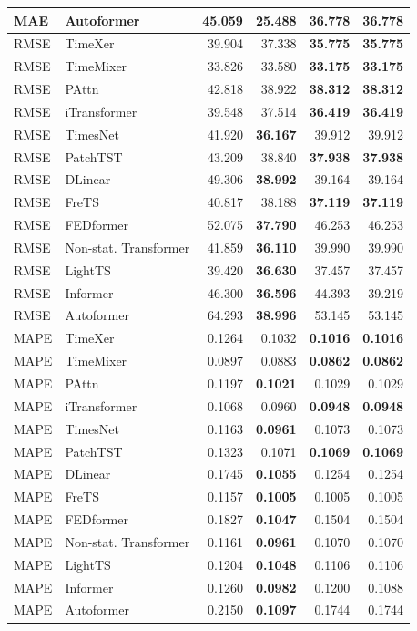 \begin{longtable}{llrrrr}
MAE & Autoformer & 45.059 & \textbf{25.488} & 36.778 & 36.778 \\
\midrule
RMSE & TimeXer & 39.904 & 37.338 & \textbf{35.775} & \textbf{35.775} \\
RMSE & TimeMixer & 33.826 & 33.580 & \textbf{33.175} & \textbf{33.175} \\
RMSE & PAttn & 42.818 & 38.922 & \textbf{38.312} & \textbf{38.312} \\
RMSE & iTransformer & 39.548 & 37.514 & \textbf{36.419} & \textbf{36.419} \\
RMSE & TimesNet & 41.920 & \textbf{36.167} & 39.912 & 39.912 \\
RMSE & PatchTST & 43.209 & 38.840 & \textbf{37.938} & \textbf{37.938} \\
RMSE & DLinear & 49.306 & \textbf{38.992} & 39.164 & 39.164 \\
RMSE & FreTS & 40.817 & 38.188 & \textbf{37.119} & \textbf{37.119} \\
RMSE & FEDformer & 52.075 & \textbf{37.790} & 46.253 & 46.253 \\
RMSE & Non-stat. Transformer & 41.859 & \textbf{36.110} & 39.990 & 39.990 \\
RMSE & LightTS & 39.420 & \textbf{36.630} & 37.457 & 37.457 \\
RMSE & Informer & 46.300 & \textbf{36.596} & 44.393 & 39.219 \\
RMSE & Autoformer & 64.293 & \textbf{38.996} & 53.145 & 53.145 \\
\midrule
MAPE & TimeXer & 0.1264 & 0.1032 & \textbf{0.1016} & \textbf{0.1016} \\
MAPE & TimeMixer & 0.0897 & 0.0883 & \textbf{0.0862} & \textbf{0.0862} \\
MAPE & PAttn & 0.1197 & \textbf{0.1021} & 0.1029 & 0.1029 \\
MAPE & iTransformer & 0.1068 & 0.0960 & \textbf{0.0948} & \textbf{0.0948} \\
MAPE & TimesNet & 0.1163 & \textbf{0.0961} & 0.1073 & 0.1073 \\
MAPE & PatchTST & 0.1323 & 0.1071 & \textbf{0.1069} & \textbf{0.1069} \\
MAPE & DLinear & 0.1745 & \textbf{0.1055} & 0.1254 & 0.1254 \\
MAPE & FreTS & 0.1157 & \textbf{0.1005} & 0.1005 & 0.1005 \\
MAPE & FEDformer & 0.1827 & \textbf{0.1047} & 0.1504 & 0.1504 \\
MAPE & Non-stat. Transformer & 0.1161 & \textbf{0.0961} & 0.1070 & 0.1070 \\
MAPE & LightTS & 0.1204 & \textbf{0.1048} & 0.1106 & 0.1106 \\
MAPE & Informer & 0.1260 & \textbf{0.0982} & 0.1200 & 0.1088 \\
MAPE & Autoformer & 0.2150 & \textbf{0.1097} & 0.1744 & 0.1744 \\
\end{longtable}
\endgroup

